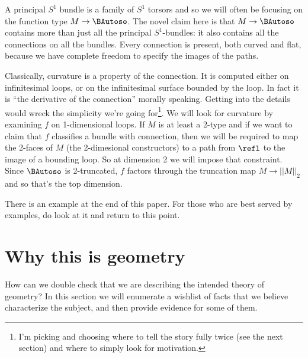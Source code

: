 A principal \(S^1\) bundle is a family of \(S^1\) torsors and so we will
often be focusing on the function type \(M\to \BAutoso\). The novel
claim here is that \(M\to \BAutoso\) contains more than just all the
principal \(S^1\)-bundles: it also contains all the connections on all
the bundles. Every connection is present, both curved and flat, because
we have complete freedom to specify the images of the paths.

Classically, curvature is a property of the connection. It is computed
either on infinitesimal loops, or on the infinitesimal surface bounded
by the loop. In fact it is ``the derivative of the connection'' morally
speaking. Getting into the details would wreck the simplicity we're
going for\footnote{I'm picking and choosing where to tell the story
  fully twice (see the next section) and where to simply look for
  motivation.}. We will look for curvature by examining \(f\) on
1-dimensional loops. If \(M\) is at least a 2-type and if we want to
claim that \(f\) classifies a bundle with connection, then we will be
required to map the 2-faces of \(M\) (the 2-dimesional constructors) to
a path from \(\refl\) to the image of a bounding loop. So at dimension 2
we will impose that constraint. Since \(\BAutoso\) is 2-truncated, \(f\)
factors through the truncation map \(M\to||M||_2\) and so that's the top
dimension.

There is an example at the end of this paper. For those who are best
served by examples, do look at it and return to this point.

\section{Why this is geometry}\label{why-this-is-geometry}

How can we double check that we are describing the intended theory of
geometry? In this section we will enumerate a wishlist of facts that we
believe characterize the subject, and then provide evidence for some of
them.


